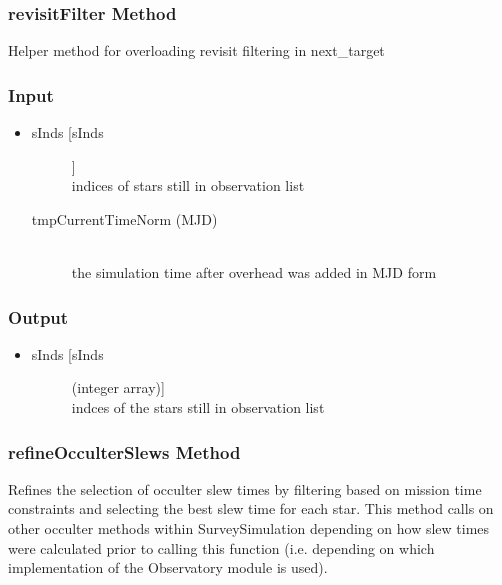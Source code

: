 \documentclass[cleanfoot]{asme2ej}
\begin{document}
\subsubsection{revisitFilter Method} \label{sec:revisitFiltertask}
Helper method for overloading revisit filtering in next\_target
\subsubsection*{Input}
\begin{itemize}
\item
\begin{description}
    \item[sInds [sInds]] \hfill \\ indices of stars still in observation list
    \item[tmpCurrentTimeNorm (MJD)] \hfill \\ the simulation time after overhead was added in MJD form
\end{description}
\end{itemize}
\subsubsection*{Output}
\begin{itemize}
\item
\begin{description}
    \item[sInds [sInds] (integer array)] \hfill \\ indces of the stars still in observation list
\end{description}
\end{itemize}

\subsubsection{refineOcculterSlews Method} \label{sec:refineOcculterSlewstask}
Refines the selection of occulter slew times by filtering based on mission time constraints and selecting the best slew time for each star. This method calls on other occulter methods within SurveySimulation depending on how slew times were calculated prior to calling this function (i.e. depending on which implementation of the Observatory module is used). 
\end{document}
